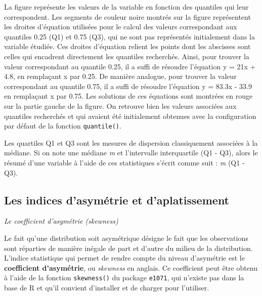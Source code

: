 \documentclass[
]{book}
\newenvironment{Shaded}{\begin{snugshade}}{\end{snugshade}}
\newcommand{\AttributeTok}[1]{\textcolor[rgb]{0.77,0.63,0.00}{#1}}
\newcommand{\DecValTok}[1]{\textcolor[rgb]{0.00,0.00,0.81}{#1}}
\newcommand{\FunctionTok}[1]{\textcolor[rgb]{0.00,0.00,0.00}{#1}}
\newcommand{\NormalTok}[1]{#1}
\newcommand{\SpecialCharTok}[1]{\textcolor[rgb]{0.00,0.00,0.00}{#1}}
\begin{document}
La figure représente les valeurs de la variable en fonction des quantiles qui leur correspondent. Les segments de couleur noire montrés sur la figure représentent les droites d'équation utilisées pour le calcul des valeurs correspondant aux quantiles 0.25 (Q1) et 0.75 (Q3), qui ne sont pas représentés initialement dans la variable étudiée. Ces droites d'équation relient les points dont les abscisses sont celles qui encadrent directement les quantiles recherchés. Ainsi, pour trouver la valeur correspondant au quantile 0.25, il a suffi de résoudre l'équation y = 21x + 4.8, en remplaçant x par 0.25. De manière analogue, pour trouver la valeur correspondant au quantile 0.75, il a suffi de résoudre l'équation y = 83.3x - 33.9 en remplaçant x par 0.75. Les solutions de ces équations sont montrées en rouge sur la partie gauche de la figure. On retrouve bien les valeurs associées aux quantiles recherchés et qui avaient été initialement obtenues avec la configuration par défaut de la fonction \texttt{quantile()}.

Les quartiles Q1 et Q3 sont les mesures de dispersion classiquement associées à la médiane. Si on note une médiane \emph{m} et l'intervalle interquartile (Q1 - Q3), alors le résumé d'une variable à l'aide de ces statistiques s'écrit comme suit : \emph{m} (Q1 - Q3).

\hypertarget{les-indices-dasymuxe9trie-et-daplatissement}{%
\subsection{Les indices d'asymétrie et d'aplatissement}\label{les-indices-dasymuxe9trie-et-daplatissement}}

\emph{Le coefficient d'asymétrie (skewness)}

Le fait qu'une distribution soit asymétrique désigne le fait que les observations sont réparties de manière inégale de part et d'autre du milieu de la distribution. L'indice statistique qui permet de rendre compte du niveau d'asymétrie est le \textbf{coefficient d'asymétrie}, ou \emph{skewness} en anglais. Ce coefficient peut être obtenu à l'aide de la fonction \texttt{skewness()} du package \texttt{e1071}, qui n'existe pas dans la base de R et qu'il convient d'installer et de charger pour l'utiliser.

\begin{Shaded}
\end{Shaded}
\end{document}
